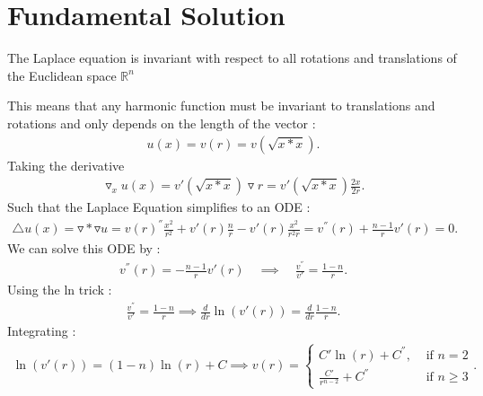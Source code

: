\section{Fundamental Solution } %
\label{sec:Fundamental Solution }
The Laplace equation is invariant with respect to all rotations and translations of the Euclidean space $\mathbb{R}^{n } $
\begin{comment}
 This means that for coordinate translations : 
 \begin{align*}
  x \mapsto x+a \coloneqq x'
 .\end{align*}
 or rotation : 
 \begin{align*}
 x \mapsto R x \coloneqq  x'
 .\end{align*}
 Where R is a rotation matrix it holds that : 
 \begin{align*}
   \triangle u_x  = \triangle u_{x'}
 .\end{align*}
 For translation it is trivial as  a vanishes , and rotation matrices have determinant 1 i.e all eigenvalues are 1
\end{comment}
This means that any harmonic function must be invariant to translations and rotations and only depends on the length of the vector : 
\begin{align*}
  u(x) = v(r) = v(\sqrt{x*x} )
.\end{align*}
Taking the derivative  
\begin{align*}
  \triangledown_x u(x) = v'(\sqrt{x*x} )\triangledown r =  v'(\sqrt{x*x} ) \frac{2x}{2r}
.\end{align*}
Such that the Laplace Equation simplifies to an ODE : 
\begin{align*}
  \triangle u(x) =  \triangledown * \triangledown u = v(r)^{''}\frac{x^2}{r^2} + v'(r)\frac{n}{r} - v'(r)\frac{x^2}{r^2r} = v^{''}(r)+\frac{n-1}{r}v'(r)  = 0 
.\end{align*}
We can solve this ODE by : 
\begin{align*}
  v^{''}(r)  = - \frac{n-1}{r} v'(r)  \quad \implies \quad \frac{v^{''} }{v'} = \frac{1-n}{r} 
.\end{align*}
Using the ln trick : 
\begin{align*}
  \frac{v^{''} }{v'} = \frac{1-n}{r}  \implies \frac{d}{dr} \ln(v'(r)) = \frac{d}{dr} \frac{1-n}{r}
.\end{align*}
Integrating : 
\begin{align*}
  \ln(v'(r)) = (1-n)\ln(r) + C \implies v(r) = \begin{cases}
    C'\ln(r) + C^{''} , &\text{ if }n=2 \\
    \frac{C'}{r^{n-2} } + C^{''} &\text{ if }n\ge 3
  \end{cases}
.\end{align*}
